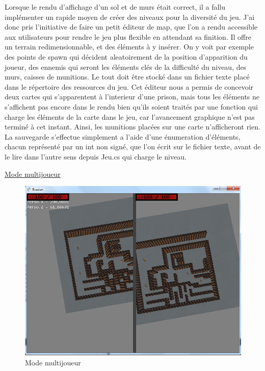 \documentclass{article}
\begin{document}
\par
Lorsque le rendu d’affichage d’un sol et de murs était correct, il a fallu implémenter un rapide moyen de créer des niveaux pour la diversité du jeu. J’ai donc pris l’initiative de faire un petit éditeur de map, que l’on a rendu accessible aux utilisateurs pour rendre le jeu plus flexible en attendant sa finition. Il offre un terrain redimensionnable, et des éléments à y insérer. On y voit par exemple des points de spawn qui décident aleatoirement de la position d’apparition du joueur, des ennemis qui seront les éléments clés de la difficulté du niveau, des murs, caisses de munitions. Le tout doit être stocké dans un fichier texte placé dans le répertoire des ressources du jeu. Cet éditeur nous a permis de concevoir deux cartes qui s’apparentent à l’interieur d’une prison, mais tous les éléments ne s’affichent pas encore dans le rendu bien qu’ils soient traités par une fonction qui charge les éléments de la carte dans le jeu, car l’avancement graphique n’est pas terminé à cet instant. Ainsi, les munitions placées sur une carte n’afficheront rien. La sauvegarde s’effectue simplement a l’aide d’une énumeration d’éléments, chacun représenté par un int non signé, que l’on écrit sur le fichier texte, avant de le lire dans l’autre sens depuis Jeu.cs qui charge le niveau.
\newline
\newpage

\underline{Mode multijoueur}

\begin{figure}[h]
\begin{center}
\includegraphics[scale=0.4]{multi.png}
\caption{Mode multijoueur}
\end{center}
\end{figure}
\end{document}
